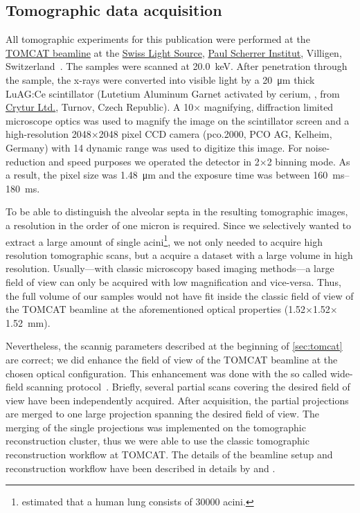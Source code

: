 \documentclass[%
	draft=false,
	paper=a4,%
	twoside=true,%
	draft=false,%
	abstract=false]{scrartcl}
\newcommand{\todojcs}[2][]{\todo[color=magenta!62!white, #1]{Johannes: #2}}
\begin{document}
\subsection{Tomographic data acquisition}\label{sec:tomcat}
All tomographic experiments for this publication were performed at the \href{http://www.psi.ch/sls/tomcat/}{TOMCAT beamline} at the \href{http://www.psi.ch/sls/}{Swiss Light Source}, \href{http://www.psi.ch/}{Paul Scherrer Institut}, Villigen, Switzerland~\cite{Stampanoni2006a}. The samples were scanned at \SI{20.0}{\kilo\electronvolt}. After penetration through the sample, the x-rays were converted into visible light by a \SI{20}{\micro\meter} thick LuAG:Ce scintillator (Lutetium Aluminum Garnet activated by cerium, , from \href{http://www.crytur.cz/}{Crytur Ltd.}, Turnov, Czech Republic). A 10\(\times\) magnifying, diffraction limited microscope optics was used to magnify the image on the scintillator screen and a high-resolution 2048\(\times\)2048 pixel CCD camera (pco.2000, PCO AG, Kelheim, Germany) with \SI{14}{\bit} dynamic range was used to digitize this image. For noise-reduction and speed purposes we operated the detector in 2\(\times\)2 binning mode. As a result, the pixel size was \SI{1.48}{\micro\meter} and the exposure time was between \SIrange{160}{180}{\milli\second}.

To be able to distinguish the alveolar septa \todojcs{How thick are they in the rat: approx.~\SI{8}{\micro\meter}?} in the resulting tomographic images, a resolution in the order of one micron is required. Since we selectively wanted to extract a large amount of single acini\footnote{\citet{Weibel1997} estimated that a human lung consists of \num{30000} acini.}, we not only needed to acquire high resolution tomographic scans, but a acquire a dataset with a large volume in high resolution. Usually---with classic microscopy based imaging methods---a large field of view can only be acquired with low magnification and vice-versa. Thus, the full volume of our samples would not have fit inside the classic field of view of the TOMCAT beamline at the aforementioned optical properties (1.52\(\times\)1.52\(\times\)\SI{1.52}{\milli\meter}).

Nevertheless, the scannig parameters described at the beginning of \autoref{sec:tomcat} are correct; we did enhance the field of view of the TOMCAT beamline at the chosen optical configuration. This enhancement was done with the so called wide-field scanning protocol~\cite{Haberthuer2010}. Briefly, several partial scans covering the desired field of view have been independently acquired. After acquisition, the partial projections are merged to one large projection spanning the desired field of view. The merging of the single projections was implemented on the tomographic reconstruction cluster, thus we were able to use the classic tomographic reconstruction workflow at TOMCAT. The details of the beamline setup and reconstruction workflow have been described in details by \citet{Stampanoni2006a} and \citet{Hintermueller2010}.
\end{document}
